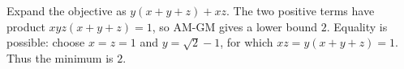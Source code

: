 Expand the objective as $y(x+y+z)+xz$. The two positive terms have product $xyz(x+y+z)=1$, so AM-GM gives a lower bound $2$. Equality is possible: choose $x=z=1$ and $y=\sqrt2-1$, for which $xz=y(x+y+z)=1$. Thus the minimum is $\boxed2$.
